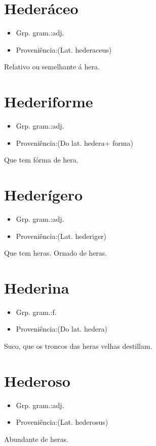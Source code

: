 \documentclass{article}
\begin{document}
\section{Hederáceo}
\begin{itemize}
\item {Grp. gram.:adj.}
\end{itemize}
\begin{itemize}
\item {Proveniência:(Lat. \textunderscore hederaceus\textunderscore )}
\end{itemize}
Relativo ou semelhante á hera.
\section{Hederiforme}
\begin{itemize}
\item {Grp. gram.:adj.}
\end{itemize}
\begin{itemize}
\item {Proveniência:(Do lat. \textunderscore hedera\textunderscore  + \textunderscore forma\textunderscore )}
\end{itemize}
Que tem fórma de hera.
\section{Hederígero}
\begin{itemize}
\item {Grp. gram.:adj.}
\end{itemize}
\begin{itemize}
\item {Proveniência:(Lat. \textunderscore hederiger\textunderscore )}
\end{itemize}
Que tem heras.
Ornado de heras.
\section{Hederina}
\begin{itemize}
\item {Grp. gram.:f.}
\end{itemize}
\begin{itemize}
\item {Proveniência:(Do lat. \textunderscore hedera\textunderscore )}
\end{itemize}
Suco, que os troncos das heras velhas destillam.
\section{Hederoso}
\begin{itemize}
\item {Grp. gram.:adj.}
\end{itemize}
\begin{itemize}
\item {Proveniência:(Lat. \textunderscore hederosus\textunderscore )}
\end{itemize}
Abundante de heras.
\end{document}

